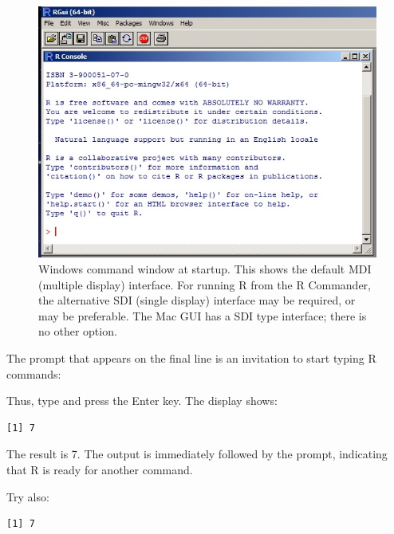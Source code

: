 \begin{figure}
\includegraphics[trim=0 18 0 0]{figs-inc/01i-gui.jpg}
\caption{Windows command window at startup. This shows the default MDI
  (multiple display) interface. For running R from the R Commander,
  the alternative SDI (single display) interface may be required, or
  may be preferable.  The Mac GUI has a SDI type interface; there is
  no other option.}
\end{figure}

\noindent
The \code{$>$} prompt that appears on the final line
is an invitation to start typing R commands:

Thus, type  and press the Enter key.
The display shows:
\begin{knitrout}
\color{fgcolor}\begin{kframe}
\begin{alltt}
\hlstd{> }\hlopt{+}
\end{alltt}
\begin{verbatim}
[1] 7
\end{verbatim}
\end{kframe}
\end{knitrout}
\noindent
{}
The result is 7. The output is immediately followed by the \code{>}
prompt, indicating that R is ready for another command.

Try also:
\begin{knitrout}
\color{fgcolor}\begin{kframe}
\begin{alltt}
\hlstd{> } \hlkwb{<-} \hlopt{+}
\hlstd{> }
\end{alltt}
\begin{verbatim}
[1] 7
\end{verbatim}
\end{kframe}
\end{knitrout}

